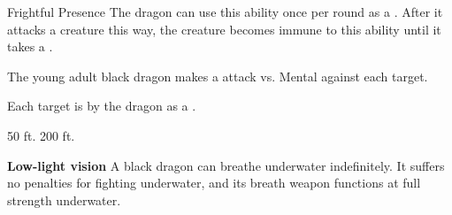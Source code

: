     \begin{freeability}{Frightful Presence}
      The dragon can use this ability once per round as a .
      After it attacks a creature this way, the creature becomes immune to this ability until it takes a .
      \par The young adult black dragon makes a  attack
        vs. Mental against each target.
    
    \hit Each target is  by the dragon as a .
    \end{freeability}
  
      
       50 ft.
     200 ft.
    \par\noindent\textbf{Low-light vision}
        A black dragon can breathe underwater indefinitely.
        It suffers no penalties for fighting underwater, and its breath weapon functions at full strength underwater.
  

